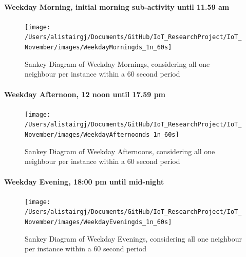 \documentclass[11pt,]{article}
\let\oldparagraph\paragraph
\renewcommand{\paragraph}[1]{\oldparagraph{#1}\mbox{}}
\begin{document}
\hypertarget{weekday-morning-initial-morning-sub-activity-until-11.59-am}{%
\paragraph{Weekday Morning, initial morning sub-activity until 11.59
am}\label{weekday-morning-initial-morning-sub-activity-until-11.59-am}}

\begin{figure}[H]

{\centering \texttt{[image: /Users/alistairgj/Documents/GitHub/IoT\_ResearchProject/IoT\_November/images/WeekdayMorningds\_1n\_60s]} 

}

\caption{Sankey Diagram of Weekday Mornings, considering all one neighbour per instance within a 60 second period}\label{fig:sankey_WeekdayMorningds_1n_60s}
\end{figure}

\hypertarget{weekday-afternoon-12-noon-until-17.59-pm}{%
\paragraph{Weekday Afternoon, 12 noon until 17.59
pm}\label{weekday-afternoon-12-noon-until-17.59-pm}}

\begin{figure}[H]

{\centering \texttt{[image: /Users/alistairgj/Documents/GitHub/IoT\_ResearchProject/IoT\_November/images/WeekdayAfternoonds\_1n\_60s]} 

}

\caption{Sankey Diagram of Weekday Afternoons, considering all one neighbour per instance within a 60 second period}\label{fig:sankey_WeekdayAfternoonds_1n_60s}
\end{figure}

\hypertarget{weekday-evening-1800-pm-until-mid-night}{%
\paragraph{Weekday Evening, 18:00 pm until
mid-night}\label{weekday-evening-1800-pm-until-mid-night}}

\begin{figure}[H]

{\centering \texttt{[image: /Users/alistairgj/Documents/GitHub/IoT\_ResearchProject/IoT\_November/images/WeekdayEveningds\_1n\_60s]} 

}

\caption{Sankey Diagram of Weekday Evenings, considering all one neighbour per instance within a 60 second period}\label{fig:sankey_WeekdayEveningds_1n_60s}
\end{figure}
\end{document}
